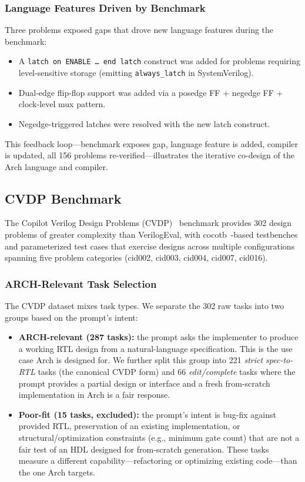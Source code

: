 \documentclass[manuscript]{acmart}
\begin{document}
\subsubsection{Language Features Driven by Benchmark}

Three problems exposed gaps that drove new language features during the benchmark:

\begin{itemize}
\item A \texttt{latch on ENABLE \ldots\ end latch} construct was added for problems requiring level-sensitive storage (emitting \texttt{always\_latch} in SystemVerilog).
\item Dual-edge flip-flop support was added via a posedge FF + negedge FF + clock-level mux pattern.
\item Negedge-triggered latches were resolved with the new latch construct.
\end{itemize}

This feedback loop---benchmark exposes gap, language feature is added, compiler is updated, all 156 problems re-verified---illustrates the iterative co-design of the Arch language and compiler.

\subsection{CVDP Benchmark}\label{sec:cvdp}

The Copilot Verilog Design Problems (CVDP)~\cite{cvdp} benchmark provides 302 design problems of greater complexity than VerilogEval, with cocotb~\cite{cocotb}-based testbenches and parameterized test cases that exercise designs across multiple configurations spanning five problem categories (cid002, cid003, cid004, cid007, cid016).

\subsubsection{ARCH-Relevant Task Selection}

The CVDP dataset mixes task types. We separate the 302 raw tasks into two groups based on the prompt's intent:

\begin{itemize}
\item \textbf{ARCH-relevant (287 tasks):} the prompt asks the implementer to produce a working RTL design from a natural-language specification. This is the use case Arch is designed for. We further split this group into 221 \emph{strict spec-to-RTL} tasks (the canonical CVDP form) and 66 \emph{edit/complete} tasks where the prompt provides a partial design or interface and a fresh from-scratch implementation in Arch is a fair response.
\item \textbf{Poor-fit (15 tasks, excluded):} the prompt's intent is bug-fix against provided RTL, preservation of an existing implementation, or structural/optimization constraints (e.g., minimum gate count) that are not a fair test of an HDL designed for from-scratch generation. These tasks measure a different capability---refactoring or optimizing existing code---than the one Arch targets.
\end{itemize}
\end{document}
